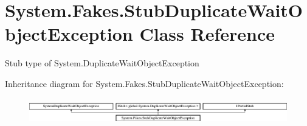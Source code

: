 \hypertarget{class_system_1_1_fakes_1_1_stub_duplicate_wait_object_exception}{\section{System.\-Fakes.\-Stub\-Duplicate\-Wait\-Object\-Exception Class Reference}
\label{class_system_1_1_fakes_1_1_stub_duplicate_wait_object_exception}
}


Stub type of System.\-Duplicate\-Wait\-Object\-Exception 


Inheritance diagram for System.\-Fakes.\-Stub\-Duplicate\-Wait\-Object\-Exception\-:\begin{figure}[H]
\begin{center}
\leavevmode
\includegraphics[height=1.155831cm]{class_system_1_1_fakes_1_1_stub_duplicate_wait_object_exception}
\end{center}
\end{figure}
